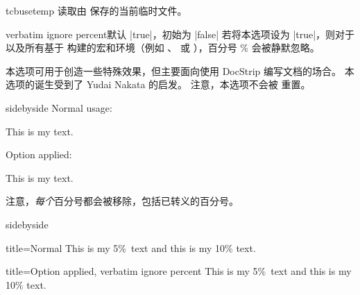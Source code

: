 \begin{docCommand}{tcbusetemp}{}
  读取由  保存的当前临时文件。
\end{docCommand}

\clearpage

\begin{docTcbKey}[][doc new=2017-07-05]{verbatim ignore percent}{}{默认 |true|，初始为 |false|}
  若将本选项设为 |true|，则对于  以及所有基于
   构建的宏和环境（例如 、
   或 ），百分号 \% 会被静默忽略。\par
  本选项可用于创造一些特殊效果，但主要面向使用 DocStrip 编写文档的场合。
  本选项的诞生受到了 Yudai Nakata 的启发。
  注意，本选项不会被  重置。
\begin{dispExample*}{sidebyside}
Normal usage:
\begin{tcbwritetemp}
This is my text.
\end{tcbwritetemp}

\tcbusetemp

\bigskip Option applied:
\begin{tcbwritetemp}
This is my text.
\end{tcbwritetemp}

\tcbusetemp
\end{dispExample*}

\begin{marker}
注意，\emph{每个}百分号都会被移除，包括已转义的百分号。
\end{marker}

\begin{dispExample*}{sidebyside}
\def\percent{\%}

\begin{tcblisting}{title=Normal}
This is my 5\percent\ text
and this is my 10\% text.
\end{tcblisting}

\begin{tcblisting}{
  title=Option applied,
  verbatim ignore percent}
This is my 5\percent\ text
and this is my 10\% text.
\end{tcblisting}
\end{dispExample*}

\end{docTcbKey}

